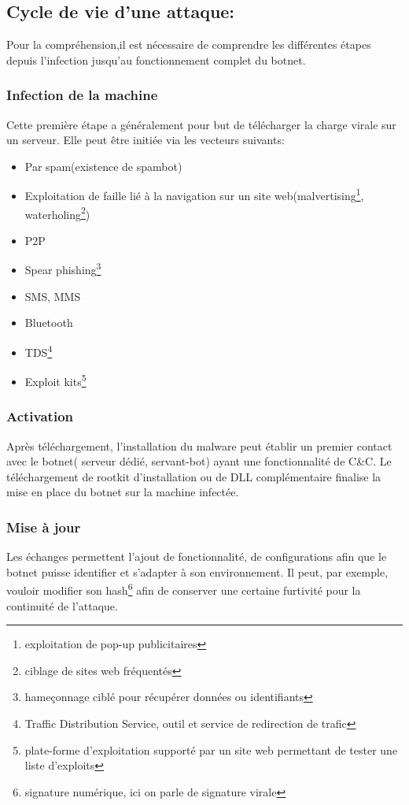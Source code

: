 \subsection{Cycle de vie d'une attaque:}
\par Pour la compréhension,il est nécessaire de comprendre les différentes étapes depuis l'infection jusqu'au fonctionnement complet du botnet.

\subsubsection{Infection de la machine}
Cette première étape a généralement pour but de télécharger la charge virale sur un serveur.
Elle peut être initiée via les vecteurs suivants:
	 \begin{itemize}
		 \item Par spam(existence de spambot)
		 \item Exploitation de faille lié à la navigation sur un site web(malvertising\footnote{exploitation de pop-up publicitaires}, waterholing\footnote{ciblage de sites web fréquentés})
		 \item P2P
		 \item Spear phishing\footnote{hameçonnage ciblé pour récupérer données ou identifiants}
		 \item SMS, MMS
		 \item Bluetooth
		 \item TDS\footnote{Traffic Distribution Service, outil et service de redirection de trafic}
		 \item Exploit kits\footnote{plate-forme d'exploitation supporté par un site web permettant de tester une liste d'exploits}
	 \end{itemize}
	
\subsubsection{Activation}
Après téléchargement, l'installation du malware peut établir un premier contact avec le botnet( serveur dédié, servant-bot) ayant une fonctionnalité de C\&C.
Le téléchargement de rootkit d'installation ou de DLL complémentaire finalise la mise en place du botnet sur la machine infectée.	
	
\subsubsection{Mise à jour}
Les échanges permettent l'ajout de fonctionnalité, de configurations afin que le botnet puisse identifier et s'adapter à son environnement.
Il peut, par exemple, vouloir modifier son hash\footnote{signature numérique, ici on parle de signature virale} afin de conserver une certaine furtivité pour la continuité de l'attaque.

